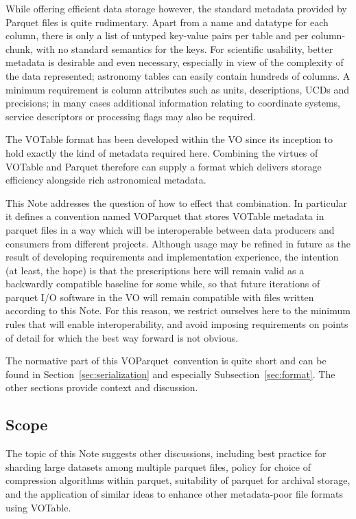 \documentclass[11pt,a4paper]{ivoa}
\newcommand{\voparquet}{VOParquet}
\begin{document}
While offering efficient data storage however,
the standard metadata provided by Parquet files is quite rudimentary.
Apart from a name and datatype for each column,
there is only a list of untyped key-value pairs per table
and per column-chunk, with no standard semantics for the keys.
For scientific usability, better metadata is desirable and even necessary,
especially in view of the complexity of the data represented;
astronomy tables can easily contain hundreds of columns.
A minimum requirement is column attributes such as units, descriptions,
UCDs and precisions; in many cases additional information relating to
coordinate systems, service descriptors or processing flags
may also be required.

The VOTable format \citep{2019ivoa.spec.1021O}
has been developed within the VO since its
inception to hold exactly the kind of metadata required here.
Combining the virtues of VOTable and Parquet therefore
can supply a format which delivers storage efficiency alongside
rich astronomical metadata.

This Note addresses the question of how to effect that combination.
In particular it defines a convention named {\voparquet}
that stores VOTable metadata in parquet files in a way
which will be interoperable
between data producers and consumers from different projects.
Although usage may be refined in future as the result of
developing requirements and implementation experience,
the intention (at least, the hope) is that the
prescriptions here will remain valid as a backwardly compatible
baseline for some while, so that future iterations of parquet I/O
software in the VO will remain compatible with files written
according to this Note.
For this reason, we restrict ourselves here to the minimum rules
that will enable interoperability, and avoid imposing requirements
on points of detail for which the best way forward is not obvious.

The normative part of this \voparquet\ convention
is quite short and can be found in Section~\ref{sec:serialization}
and especially Subsection~\ref{sec:format}.
The other sections provide context and discussion.

\subsection{Scope}
\label{sec:scope}

The topic of this Note suggests other discussions, including
best practice for sharding large datasets among multiple parquet files,
policy for choice of compression algorithms within parquet,
suitability of parquet for archival storage,
and the application of similar ideas to enhance other metadata-poor
file formats using VOTable.
\end{document}
